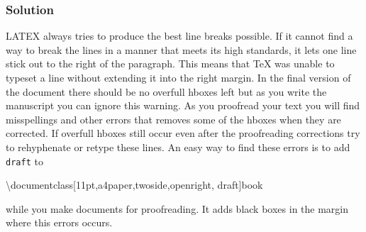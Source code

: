 \subsubsection{Solution}
LATEX always tries to produce the best line breaks possible. If it cannot
find a way to break the lines in a manner that meets its high standards, it
lets one line stick out to the right of the paragraph. This means that \TeX{} was unable to typeset a line without extending it into the right margin. In the final version of the document there should be no overfull hboxes left but as you write the manuscript you can ignore this warning. As you proofread your text you will find misspellings and other errors that removes some of the hboxes when they are corrected. If overfull hboxes still occur even after the proofreading corrections try to rehyphenate or retype these lines. An easy way to find these errors is to add {\footnotesize\verb!draft!} to

\begin{code}
\textbackslash documentclass[11pt,a4paper,twoside,openright, draft]{book}
\end{code}

\noindent while you make documents for proofreading. It adds black boxes in the margin where this errors occurs.